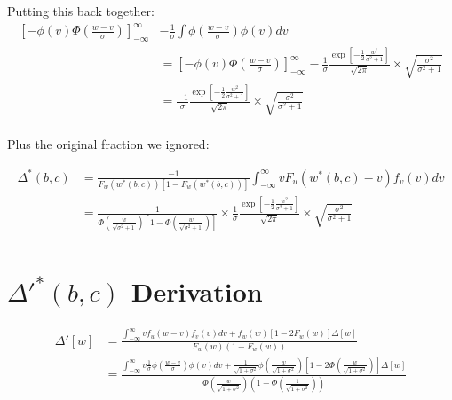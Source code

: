\documentclass{article}
\begin{document}
Putting this back together:
\begin{align*}
 \left[
        -\phi(v) \Phi\left(\frac{w-v}{\sigma}\right) 
    \right]^\infty_{-\infty} &-\frac{1}{\sigma} \int \phi\left(\frac{w - v}{\sigma}\right) \phi(v) dv  
     \\
    &=
 \left[
        -\phi(v) \Phi\left(\frac{w-v}{\sigma}\right) 
    \right]^\infty_{-\infty} -
    \frac{1}{\sigma} \frac{
        \exp \left[
            -\frac{1}{2}\frac{w^2}{\sigma^2 + 1}
        \right]
    }{\sqrt{2\pi}} \times 
                    \sqrt{
                        \frac{\sigma^2}{\sigma^2 + 1}
                    }  \\
&=
    \frac{-1}{\sigma} \frac{
        \exp \left[
            -\frac{1}{2}\frac{w^2}{\sigma^2 + 1}
        \right]
    }{\sqrt{2\pi}} \times 
                    \sqrt{
                        \frac{\sigma^2}{\sigma^2 + 1}
                    }  \\
\end{align*}


Plus the original fraction we ignored:

\begin{align*}
    \Delta^*(b,c) &= \frac{
        -1
    }{
        F_w(w^*(b,c)) [1 - F_w(w^*(b,c))]
    } \int^\infty_{-\infty} vF_u(w^*(b,c) - v) f_v(v) dv \\
     &= 
\frac{
        1
    }{
        \Phi\left(\frac{w}{\sqrt{\sigma^2 + 1}}\right)
         \left[1 - \Phi\left(\frac{
            w
        }{
            \sqrt{\sigma^2 + 1}
        }\right)\right]
    } \times 
    \frac{1}{\sigma} \frac{
        \exp \left[
            -\frac{1}{2}\frac{w^2}{\sigma^2 + 1}
        \right]
    }{\sqrt{2\pi}} \times 
                    \sqrt{
                        \frac{\sigma^2}{\sigma^2 + 1}
                    }  \\
\end{align*}

\section*{$\Delta'^*(b,c)$ Derivation}


\begin{align*}
   \Delta'[w] &= 
   \frac{
    \int^\infty_{-\infty} v f_u(w - v) f_v(v) dv 
    + f_w(w) \left[
        1 - 2 F_w(w)
    \right] \Delta[w]
   }{
    F_w(w)(1 - F_w(w))
   } \\
   &= 
   \frac{
    \int^\infty_{-\infty} v \frac{1}{\sigma}\phi\left(\frac{w - v}{\sigma}\right) \phi(v) dv 
    + \frac{1}{\sqrt{1 + \sigma^2}}\phi\left(\frac{w}{\sqrt{1 + \sigma^2}}\right) \left[
        1 - 2 \Phi(\frac{w}{\sqrt{1 + \sigma^2}})
    \right] \Delta[w]
   }{
    \Phi\left(\frac{w}{\sqrt{1 + \sigma^2}}\right)\left(1 - \Phi\left(\frac{1}{\sqrt{1 + \sigma^2}}\right)\right)
   } \\
\end{align*}
\end{document}
